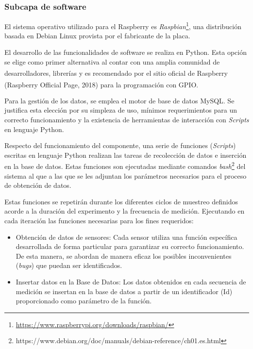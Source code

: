            \subsubsection{Subcapa de software}
                \par El sistema operativo utilizado para el Raspberry\textsuperscript{\textregistered} es \textit{Raspbian}\footnote{\url{https://www.raspberrypi.org/downloads/raspbian/}}, una distribución basada en Debian Linux provista por el fabricante de la placa.
                
               \par El desarrollo de las funcionalidades de software se realiza en Python. Esta opción se elige como primer alternativa al contar con una amplia comunidad de desarrolladores, librerías y es recomendado por el sitio oficial de Raspberry\textsuperscript{\textregistered} (Raspberry\textsuperscript{\textregistered} Official Page, 2018) para la programación con GPIO.
                
                \par Para la gestión de los datos, se emplea el motor de base de datos MySQL. Se justifica esta elección por su simpleza de uso, mínimos requerimientos para un correcto funcionamiento y la existencia de herramientas de interacción con \textit{Scripts} en lenguaje Python.
                
                \par Respecto del funcionamiento del componente, una serie de funciones (\textit{Scripts}) escritas en lenguaje Python realizan las tareas de recolección de datos e inserción en la base de datos. Estas funciones son ejecutadas mediante comandos \textit{bash}\footnote{https://www.debian.org/doc/manuals/debian-reference/ch01.es.html} del sistema al que a las que se les adjuntan los parámetros necesarios para el proceso de obtención de datos.
                \par Estas funciones se repetirán durante los diferentes ciclos de muestreo definidos acorde a la duración del experimento y la frecuencia de medición. Ejecutando en cada iteración las funciones necesarias para los fines requeridos:
                    
                    \begin{itemize}
                        \item Obtención de datos de sensores: Cada sensor utiliza una función específica desarrollada de forma particular para garantizar su correcto funcionamiento. De esta manera, se abordan de manera eficaz los posibles inconvenientes (\textit{bugs}) que puedan ser identificados.
                        
                        \item Insertar datos en la Base de Datos: Los datos obtenidos en cada secuencia de medición se insertan en la base de datos a partir de un identificador (Id) proporcionado como parámetro de la función.
                    \end{itemize}
                
